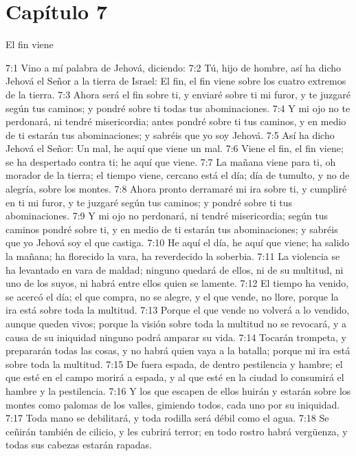 \section*{Capítulo 7 } 
El fin viene   
  
7:1 Vino a mí palabra de Jehová, diciendo:   
7:2 Tú, hijo de hombre, así ha dicho Jehová el Señor a la tierra de Israel: El fin, el fin viene sobre los cuatro extremos de la tierra.   
7:3 Ahora será el fin sobre ti, y enviaré sobre ti mi furor, y te juzgaré según tus caminos; y pondré sobre ti todas tus abominaciones.   
7:4 Y mi ojo no te perdonará, ni tendré misericordia; antes pondré sobre ti tus caminos, y en medio de ti estarán tus abominaciones; y sabréis que yo soy Jehová.   
7:5 Así ha dicho Jehová el Señor: Un mal, he aquí que viene un mal.   
7:6 Viene el fin, el fin viene; se ha despertado contra ti; he aquí que viene.   
7:7 La mañana viene para ti, oh morador de la tierra; el tiempo viene, cercano está el día; día de tumulto, y no de alegría, sobre los montes.   
7:8 Ahora pronto derramaré mi ira sobre ti, y cumpliré en ti mi furor, y te juzgaré según tus caminos; y pondré sobre ti tus abominaciones.   
7:9 Y mi ojo no perdonará, ni tendré misericordia; según tus caminos pondré sobre ti, y en medio de ti estarán tus abominaciones; y sabréis que yo Jehová soy el que castiga.   
7:10 He aquí el día, he aquí que viene; ha salido la mañana; ha florecido la vara, ha reverdecido la soberbia.   
7:11 La violencia se ha levantado en vara de maldad; ninguno quedará de ellos, ni de su multitud, ni uno de los suyos, ni habrá entre ellos quien se lamente.   
7:12 El tiempo ha venido, se acercó el día; el que compra, no se alegre, y el que vende, no llore, porque la ira está sobre toda la multitud.   
7:13 Porque el que vende no volverá a lo vendido, aunque queden vivos; porque la visión sobre toda la multitud no se revocará, y a causa de su iniquidad ninguno podrá amparar su vida.   
7:14 Tocarán trompeta, y prepararán todas las cosas, y no habrá quien vaya a la batalla; porque mi ira está sobre toda la multitud.   
7:15 De fuera espada, de dentro pestilencia y hambre; el que esté en el campo morirá a espada, y al que esté en la ciudad lo consumirá el hambre y la pestilencia.   
7:16 Y los que escapen de ellos huirán y estarán sobre los montes como palomas de los valles, gimiendo todos, cada uno por su iniquidad.   
7:17 Toda mano se debilitará, y toda rodilla será débil como el agua.   
7:18 Se ceñirán también de cilicio, y les cubrirá terror; en todo rostro habrá vergüenza, y todas sus cabezas estarán rapadas.   
